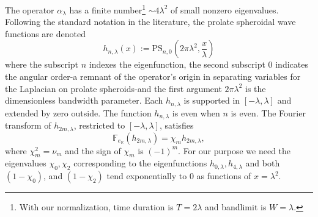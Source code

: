 \documentclass{article}
\begin{document}
The operator \( \alpha_\lambda \) has a finite number\footnote{With our normalization, time duration is \( T = 2\lambda \) and bandlimit is \( W = \lambda \).} \( \sim 4\lambda^2 \) of small nonzero eigenvalues.  Following the standard notation in the literature, the prolate spheroidal wave functions are denoted
$$
h_{n, \lambda}(x):=\mathrm{PS}_{n, 0}\left(2 \pi \lambda^2, \frac{x}{\lambda}\right)
$$
where the subscript $n$ indexes the eigenfunction, the second subscript $0$ indicates the angular order-a remnant of the operator's origin in separating variables for the Laplacian on prolate spheroids-and the first argument $2 \pi \lambda^2$ is the dimensionless bandwidth parameter.
Each \( h_{n,\lambda} \) is supported in \( [-\lambda,\lambda] \) and extended by zero outside. The function \( h_{n,\lambda} \) is even when \( n \) is even. The Fourier transform of \( h_{2m,\lambda} \), restricted to \( [-\lambda, \lambda] \), satisfies
\[
\mathbb{F}_{e_{\mathbb{R}}}(h_{2m,\lambda}) = \chi_m h_{2m,\lambda},
\]
where $\chi_m^2=\nu_{m}$ and the sign of $\chi_m$ is $(-1)^m$. For our purpose we need the eigenvalues $\chi_0, \chi_2$ corresponding to the eigenfunctions $h_{0,\lambda},h_{4,\lambda}$ and both $(1-\chi_0)$, and $(1-\chi_2)$ tend exponentially to $0$ as functions of $x=\lambda^2$.
\end{document}
